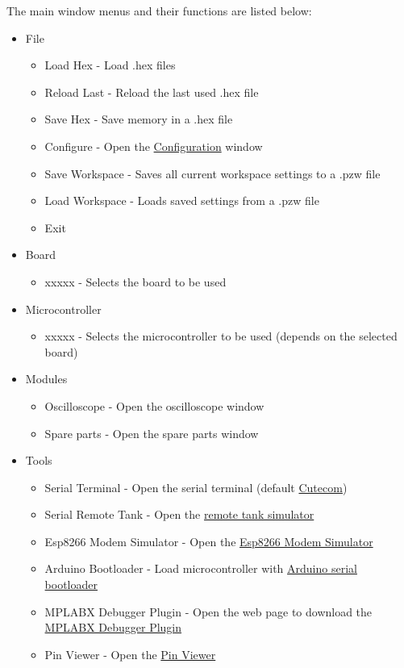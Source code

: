 The main window menus and their functions are listed below:
\begin{itemize}
\item File
\begin{itemize}
\item Load Hex - Load .hex files
\item Reload Last - Reload the last used .hex file
\item Save Hex - Save memory in a .hex file
\item Configure - Open the \hyperlink{def:prjwizard}{Configuration} window
\item Save Workspace - Saves all current workspace settings to a .pzw file
\item Load Workspace - Loads saved settings from a .pzw file
\item Exit
\end{itemize}
\item Board
\begin{itemize}
\item xxxxx - Selects the board to be used 
\end{itemize}
\item Microcontroller
\begin{itemize}
 \item xxxxx - Selects the microcontroller to be used (depends on the selected board)
\end{itemize}
\item Modules
\begin{itemize}
\item Oscilloscope - Open the oscilloscope window
\item Spare parts - Open the spare parts window
\end{itemize}
\item Tools 
\begin{itemize}
 \item Serial Terminal - Open the serial terminal (default \hyperlink{def:sterm}{Cutecom})
 \item Serial Remote Tank - Open the \hyperlink{def:srtank}{remote tank simulator}
 \item Esp8266 Modem Simulator -  Open the \hyperlink{def:espmsim}{Esp8266 Modem Simulator}
 \item Arduino Bootloader - Load microcontroller with \hyperlink{def:aboot}{Arduino serial bootloader} 
 \item MPLABX Debugger Plugin - Open the web page to download the \hyperlink{def:mpdebug}{MPLABX Debugger Plugin} 
 \item Pin Viewer - Open the \hyperlink{def:pinv}{Pin Viewer} 

\end{itemize}
\end{itemize}
